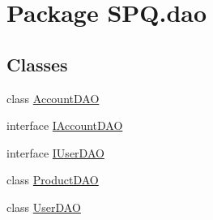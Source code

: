 \hypertarget{namespace_s_p_q_1_1dao}{}\section{Package S\+P\+Q.\+dao}
\label{namespace_s_p_q_1_1dao}
\subsection*{Classes}
\begin{DoxyCompactItemize}
\item 
class \mbox{\hyperlink{class_s_p_q_1_1dao_1_1_account_d_a_o}{Account\+D\+AO}}
\item 
interface \mbox{\hyperlink{interface_s_p_q_1_1dao_1_1_i_account_d_a_o}{I\+Account\+D\+AO}}
\item 
interface \mbox{\hyperlink{interface_s_p_q_1_1dao_1_1_i_user_d_a_o}{I\+User\+D\+AO}}
\item 
class \mbox{\hyperlink{class_s_p_q_1_1dao_1_1_product_d_a_o}{Product\+D\+AO}}
\item 
class \mbox{\hyperlink{class_s_p_q_1_1dao_1_1_user_d_a_o}{User\+D\+AO}}
\end{DoxyCompactItemize}
